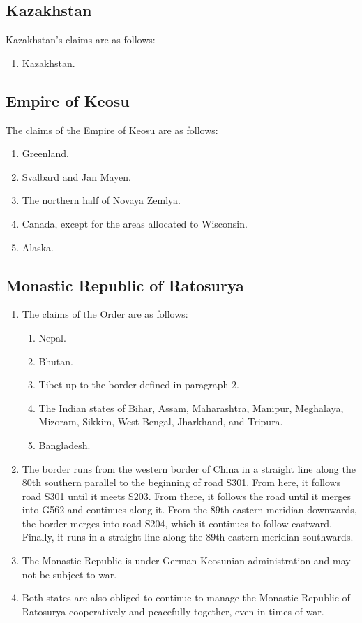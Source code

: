 \documentclass{article}
\begin{document}
\subsection{Kazakhstan}
Kazakhstan's claims are as follows:
\begin{enumerate}
    \item Kazakhstan.
\end{enumerate}

\subsection{Empire of Keosu}
The claims of the Empire of Keosu are as follows:
\begin{enumerate}
    \item Greenland.
    \item Svalbard and Jan Mayen.
    \item The northern half of Novaya Zemlya.
    \item Canada, except for the areas allocated to Wisconsin.
    \item Alaska.
\end{enumerate}

\subsection{Monastic Republic of Ratosurya}\label{order}
\begin{enumerate}[(1)]
    \item The claims of the Order are as follows:
    \begin{enumerate}[1.]
        \item Nepal.
        \item Bhutan.
        \item Tibet up to the border defined in paragraph 2.
        \item The Indian states of Bihar, Assam, Maharashtra, Manipur, Meghalaya, Mizoram, Sikkim, West Bengal, Jharkhand, and Tripura.
        \item Bangladesh.
    \end{enumerate}
    \item The border runs from the western border of China in a straight line along the 80th southern parallel to the beginning of road S301. From here, it follows road S301 until it meets S203. From there, it follows the road until it merges into G562 and continues along it. From the 89th eastern meridian downwards, the border merges into road S204, which it continues to follow eastward. Finally, it runs in a straight line along the 89th eastern meridian southwards.
    \item The Monastic Republic is under German-Keosunian administration and may not be subject to war.
    \item Both states are also obliged to continue to manage the Monastic Republic of Ratosurya cooperatively and peacefully together, even in times of war.
\end{enumerate}
\end{document}
